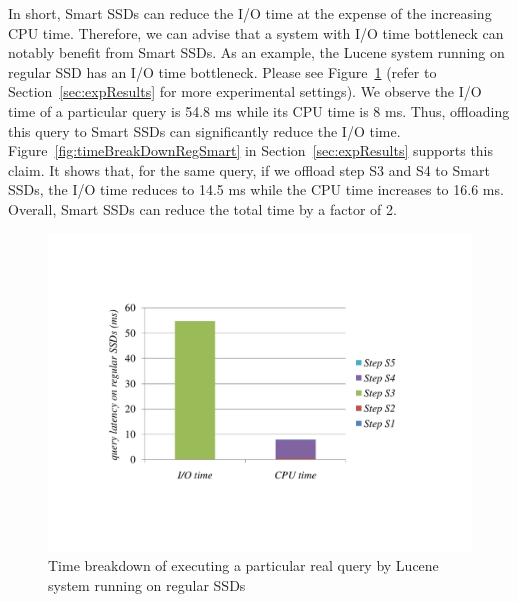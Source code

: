 In short, Smart SSDs can reduce the I/O time at the expense of the increasing CPU time. Therefore, we can advise that a system with I/O time bottleneck can notably benefit from Smart SSDs. As an example, the Lucene system running on regular SSD has an I/O time bottleneck. Please see Figure~\ref{fig:timeBreakDownRegularSSD} (refer to Section~\ref{sec:expResults} for more experimental settings). We observe the I/O time of a particular query is 54.8 ms while its CPU time is 8 ms. Thus, offloading this query to Smart SSDs can significantly reduce the I/O time. Figure~\ref{fig:timeBreakDownRegSmart} in Section~\ref{sec:expResults} supports this claim.  It shows that, for the same query, if we offload step S3 and S4 to Smart SSDs, the I/O time reduces to 14.5 ms while the CPU time increases to 16.6 ms. Overall, Smart SSDs can reduce the total time by a factor of 2.




\begin{figure}[htbp]
	\centering
		\includegraphics[width=0.8\columnwidth]{figures/timeBreakDownRegularSSD.pdf}
	\caption{\small Time breakdown of executing a particular real query by Lucene system running on regular SSDs}
	\label{fig:timeBreakDownRegularSSD}
\end{figure}




